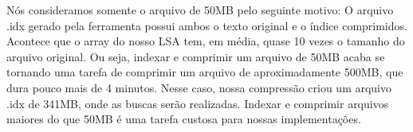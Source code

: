 Nós consideramos somente o arquivo de 50MB pelo seguinte motivo: O arquivo .idx
gerado pela ferramenta \ipmt possui ambos o texto original e o índice
comprimidos. Acontece que o array do nosso LSA tem, em média, quase 10 vezes o
tamanho do arquivo original. Ou seja, indexar e comprimir um arquivo de 50MB
acaba se tornando uma tarefa de comprimir um arquivo de aproximadamente 500MB,
que dura pouco mais de 4 minutos. Nesse caso, nossa compressão criou um arquivo
.idx de 341MB, onde as buscas serão realizadas. Indexar e comprimir arquivos
maiores do que 50MB é uma tarefa custosa para nossas implementações.



\subsection{\rqthree}


